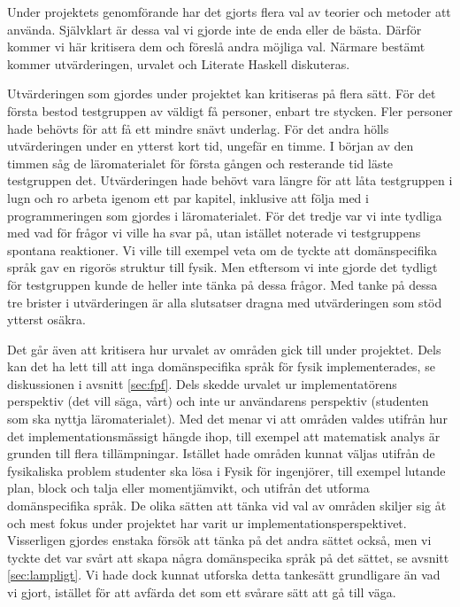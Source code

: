 \begin{binge}
Under projektets genomförande har det gjorts flera val av teorier och metoder att använda. Självklart är dessa val vi gjorde inte de enda eller de bästa. Därför kommer vi här kritisera dem och föreslå andra möjliga val. Närmare bestämt kommer utvärderingen, urvalet och Literate Haskell diskuteras.

Utvärderingen som gjordes under projektet kan kritiseras på flera sätt. För det första bestod testgruppen av väldigt få personer, enbart tre stycken. Fler personer hade behövts för att få ett mindre snävt underlag. För det andra hölls utvärderingen under en ytterst kort tid, ungefär en timme. I början av den timmen såg de läromaterialet för första gången och resterande tid läste testgruppen det. Utvärderingen hade behövt vara längre för att låta testgruppen i lugn och ro arbeta igenom ett par kapitel, inklusive att följa med i programmeringen som gjordes i läromaterialet. För det tredje var vi inte tydliga med vad för frågor vi ville ha svar på, utan istället noterade vi testgruppens spontana reaktioner. Vi ville till exempel veta om de tyckte att domänspecifika språk gav en rigorös struktur till fysik. Men etftersom vi inte gjorde det tydligt för testgruppen kunde de heller inte tänka på dessa frågor. Med tanke på dessa tre brister i utvärderingen är alla slutsatser dragna med utvärderingen som stöd ytterst osäkra.

Det går även att kritisera hur urvalet av områden gick till under projektet. Dels kan det ha lett till att inga domänspecifika språk för fysik implementerades, se diskussionen i avsnitt \ref{sec:fpf}. Dels skedde urvalet ur implementatörens perspektiv (det vill säga, vårt) och inte ur användarens perspektiv (studenten som ska nyttja läromaterialet). Med det menar vi att områden valdes utifrån hur det implementationsmässigt hängde ihop, till exempel att matematisk analys är grunden till flera tillämpningar. Istället hade områden kunnat väljas utifrån de fysikaliska problem studenter ska lösa i Fysik för ingenjörer, till exempel lutande plan, block och talja eller momentjämvikt, och utifrån det utforma domänspecifika språk. De olika sätten att tänka vid val av områden skiljer sig åt och mest fokus under projektet har varit ur implementationsperspektivet. Visserligen gjordes enstaka försök att tänka på det andra sättet också, men vi tyckte det var svårt att  skapa några domänspecika språk på det sättet, se avsnitt \ref{sec:lampligt}. Vi hade dock kunnat utforska detta tankesätt grundligare än vad vi gjort, istället för att avfärda det som ett svårare sätt att gå till väga.


\end{binge}
